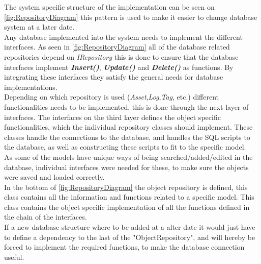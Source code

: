 The system specific structure of the implementation can be seen on \autoref{fig:RepositoryDiagram} this pattern is used to make it easier to change database system at a later date. \\
Any database implemented into the system needs to implement the different interfaces. As seen in \autoref{fig:RepositoryDiagram} all of the database related repositories depend on \textit{IRepository} this is done to ensure that the database interfaces implement \textbf{\textit{Insert()}}, \textbf{\textit{Update()}} and \textbf{\textit{Delete()}} as functions. By integrating these interfaces they satisfy the general needs for database implementations. \\
Depending on which repository is used (\textit{Asset},\textit{Log},\textit{Tag}, etc.) different functionalities needs to be implemented, this is done through the next layer of interfaces. The interfaces on the third layer defines the object specific functionalities, which the individual repository classes should implement. These classes handle the connections to the database, and handles the SQL scripts to the database, as well as constructing these scripts to fit to the specific model. \\
As some of the models have unique ways of being searched/added/edited in the database, individual interfaces were needed for these, to make sure the objects were saved and loaded correctly. \\
In the bottom of \autoref{fig:RepositoryDiagram} the object repository is defined, this class contains all the information and functions related to a specific model. This class contains the object specific implementation of all the functions defined in the chain of the interfaces. \\
If a new database structure where to be added at a alter date it would just have to define a dependency to the last of the "ObjectRepository", and will hereby be forced to implement the required functions, to make the database connection useful.
